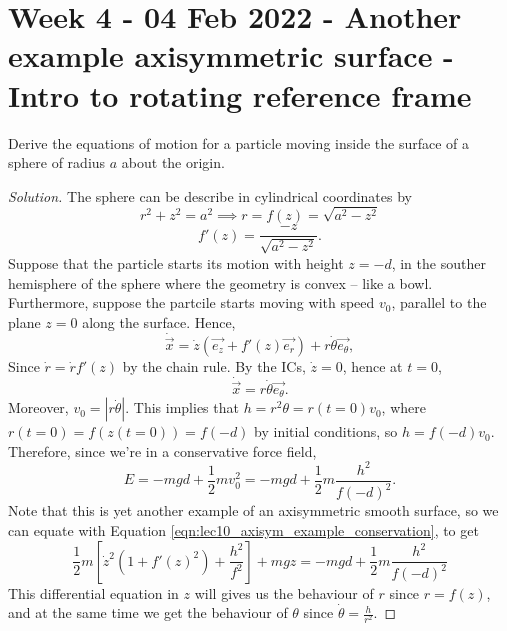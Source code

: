 \section{Week 4 - 04 Feb 2022 - Another example axisymmetric surface - Intro to
rotating reference frame}
\begin{example}
  Derive the equations of motion for a particle moving inside the surface of a
  sphere of radius $a$ about the origin.
\end{example}
\begin{proof}[Solution]
  The sphere can be describe in cylindrical coordinates by
  \[r^2 + z^2 = a^2 \implies r=f(z)= \sqrt{a^2-z^2}\]
  \[f'(z)= \frac{-z}{\sqrt{a^2-z^2}}.\]
  Suppose that the particle starts its motion with height $z=-d$, in the souther
  hemisphere of the sphere where the geometry is convex -- like a bowl.
  Furthermore, suppose the partcile starts moving with speed $v_0$, parallel to
  the plane $z=0$ along the surface. Hence,
  \[\dot{\vec{x}} = \dot{z}(\vec{e_z} + f'(z)\vec{e_r}) +
  r\dot{\theta}\vec{e_{\theta}},\]
  Since $\dot{r}=\dot{r}f'(z)$ by the chain rule. By the ICs, $\dot{z}=0$,
  hence at $t=0$,
  \[\dot{\vec{x}}=r\dot{\theta} \vec{e_{\theta}}.\]
  Moreover, $v_0=|r\dot{\theta}|$. This implies that $h=r^2\theta=r(t=0) v_0$,
  where $r(t=0)=f(z(t=0))=f(-d)$ by initial conditions, so $h=f(-d)v_0$.
  Therefore, since we're in a conservative force field, 
  \[E=-mgd + \frac{1}{2}mv_0^2 = -mgd + \frac{1}{2}m\frac{h^2}{f(-d)^2}.\]
  Note that this is yet another example of an axisymmetric smooth surface, so we
  can equate with Equation \ref{eqn:lec10_axisym_example_conservation}, to get 
  \[
    \frac{1}{2}m\left[ \dot{z}^2 (1+f'(z)^2) + \frac{h^2}{f^2}\right] +mgz =
  -mgd + \frac{1}{2}m\frac{h^2}{f(-d)^2}
  \]
  This differential equation in $z$ will gives us the behaviour of $r$ since
  $r=f(z)$, and at the same time we get the behaviour of $\theta$ since
  $\dot{\theta}=\frac{h}{r^2}$.
\end{proof}

